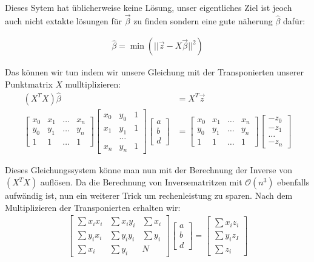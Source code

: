 \documentclass[11pt,oneside,openright]{mpreport}
\begin{document}
Dieses Sytem hat üblicherweise keine Lösung, unser eigentliches Ziel ist jeoch auch nicht extakte lösungen für $\vec\beta$ zu finden sondern eine gute näherung $\hat{\beta}$ dafür:

\begin{align*}
\hat{\beta} = \min{(|| \vec{z} - X\vec{\beta} ||^2)}
\end{align*}

Das können wir tun indem wir unsere Gleichung mit der Transponierten unserer Punktmatrix $X$ mulltiplizieren:
\begin{align*}
(X^TX) \hat{\beta} &= X^T \vec{z}\\
\begin{bmatrix}
x_0 & x_1 & \dots & x_n \\
y_0 & y_1 & \dots & y_n \\
1 & 1 & \dots & 1  
\end{bmatrix} 
\begin{bmatrix}
x_0 & y_0 & 1 \\
x_1 & y_1 & 1 \\
 & \dots & \\
x_n & y_n & 1 
\end{bmatrix} 
\begin{bmatrix}
a \\
b \\
d 
\end{bmatrix} 
 &= 
\begin{bmatrix}
x_0 & x_1 & \dots & x_n \\
y_0 & y_1 & \dots & y_n \\
1 & 1 & \dots & 1  
\end{bmatrix} 
\begin{bmatrix}
-z_0 \\
-z_1 \\
\dots \\
-z_n 
\end{bmatrix} 
\end{align*}

Dieses Gleichungssystem könne man nun mit der Berechnung der Inverse von $(X^TX)$ auflösen. Da die Berechnung von Inversematritzen mit $\mathcal{O}(n^3)$ ebenfalls aufwändig ist,
nun ein weiterer Trick um rechenleistung zu sparen.
Nach dem Multiplizieren der Transponierten erhalten wir:
\begin{align*}
\begin{bmatrix}
\sum x_i x_i & \sum x_i y_i & \sum x_i \\
\sum y_i x_i & \sum y_i y_i & \sum y_i \\
\sum x_i & \sum y_i & N
\end{bmatrix} 
\begin{bmatrix}
a \\
b \\
d 
\end{bmatrix} 
 = 
\begin{bmatrix}
\sum x_i z_i \\
\sum y_i z_I \\
\sum z_i 
\end{bmatrix} 
\end{align*}
\end{document}
